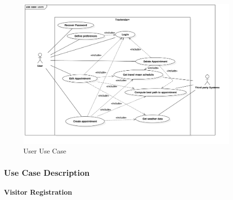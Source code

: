 \documentclass[12pt]{article}
\begin{document}
\begin{figure}[H]
        \includegraphics[scale=0.23]{userUseCase.png}
        \centering
        \caption{User Use Case}
    \label{fig:userUseCase}
\end{figure}
    
\newpage

\subsubsection{Use Case Description}
\paragraph{Visitor Registration}
\end{document}
